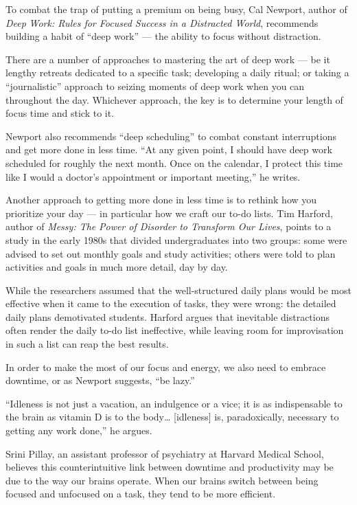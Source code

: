 \documentclass[UTF8,11pt]{ctexart}
\begin{document}
To combat the trap of putting a premium on being busy, Cal Newport, author of \textit{Deep} \textit{Work: Rules for Focused Success in a Distracted World}, recommends building a habit of “deep work” — the ability to focus without distraction.


There are a number of approaches to mastering the art of deep work — be it lengthy retreats dedicated to a specific task; developing a daily ritual; or taking a “journalistic” approach to seizing moments of deep work when you can throughout the day. Whichever approach, the key is to determine your length of focus time and stick to it.


Newport also recommends “deep scheduling” to combat constant interruptions and get more done in less time. “At any given point, I should have deep work scheduled for roughly the next month. Once on the calendar, I protect this time like I would a doctor’s appointment or important meeting,” he writes.


Another approach to getting more done in less time is to rethink how you prioritize your day — in particular how we craft our to-do lists. Tim Harford, author of \textit{Messy: The} \textit{Power of Disorder to Transform Our Lives}, points to a study in the early 1980s that divided undergraduates into two groups: some were advised to set out monthly goals and study activities; others were told to plan activities and goals in much more detail, day by day.


While the researchers assumed that the well-structured daily plans would be most effective when it came to the execution of tasks, they were wrong: the detailed daily plans demotivated students. Harford argues that inevitable distractions often render the daily to-do list ineffective, while leaving room for improvisation in such a list can reap the best results.


In order to make the most of our focus and energy, we also need to embrace downtime, or as Newport suggests, “be lazy.”


“Idleness is not just a vacation, an indulgence or a vice; it is as indispensable to the brain as vitamin D is to the body… [idleness] is, paradoxically, necessary to getting any work done,” he argues.


Srini Pillay, an assistant professor of psychiatry at Harvard Medical School, believes this counterintuitive link between downtime and productivity may be due to the way our brains operate. When our brains switch between being focused and unfocused on a task, they tend to be more efficient.
\end{document}

